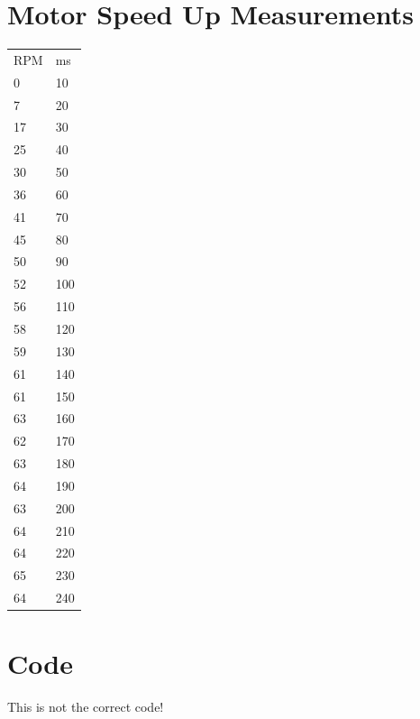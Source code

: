 \documentclass{article}
\begin{document}
\section{Motor Speed Up Measurements}\label{appendix:motorspeedtable}
\begin{table}[h]
\begin{tabular}{ll}
RPM & ms \\
0           & 10        \\
7           & 20        \\
17          & 30        \\
25          & 40        \\
30          & 50        \\
36          & 60        \\
41          & 70        \\
45          & 80        \\
50          & 90        \\
52          & 100       \\
56          & 110       \\
58          & 120       \\
59          & 130       \\
61          & 140       \\
61          & 150       \\
63          & 160       \\
62          & 170       \\
63          & 180       \\
64          & 190       \\
63          & 200       \\
64          & 210       \\
64          & 220       \\
65          & 230       \\
64          & 240      
\end{tabular}
\end{table}
\section{Code}\label{appendix:code}

This is not the correct code!






\end{document}
